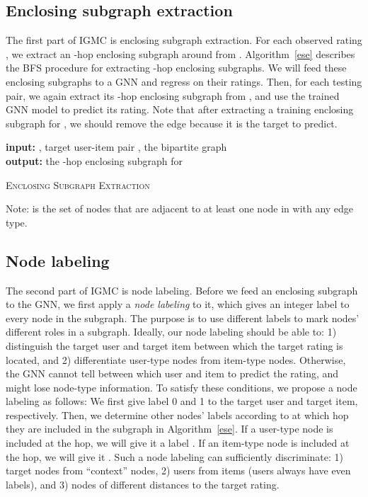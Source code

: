 \documentclass{article} \usepackage{iclr2020_conference,times}
\begin{document}
\subsection{Enclosing subgraph extraction}
The first part of IGMC is enclosing subgraph extraction. For each observed rating , we extract an -hop enclosing subgraph around  from . Algorithm~\ref{ese} describes the BFS procedure for extracting -hop enclosing subgraphs. We will feed these enclosing subgraphs to a GNN and regress on their ratings. Then, for each testing  pair, we again extract its -hop enclosing subgraph from , and use the trained GNN model to predict its rating. Note that after extracting a training enclosing subgraph for , we should remove the edge  because it is the target to predict. 

\begin{algorithm}[tp]
\begin{algorithmic}[1]
\STATE \textbf{input:} , target user-item pair , the bipartite graph  \\
\STATE \textbf{output:} the -hop enclosing subgraph  for \\
\STATE{}
\FOR{}
\STATE{}
\STATE{}
\STATE{}
\STATE{}
\ENDFOR
\RETURN{}
\end{algorithmic}
\caption{\textsc{Enclosing Subgraph Extraction}}\label{ese}
\footnotesize Note:  is the set of nodes that are adjacent to at least one node in  with any edge type.
\end{algorithm}

\subsection{Node labeling}
The second part of IGMC is node labeling. Before we feed an enclosing subgraph to the GNN, we first apply a \textit{node labeling} to it, which gives an integer label to every node in the subgraph. The purpose is to use different labels to mark nodes' different roles in a subgraph. Ideally, our node labeling should be able to: 1) distinguish the target user and target item between which the target rating is located, and 2) differentiate user-type nodes from item-type nodes. Otherwise, the GNN cannot tell between which user and item to predict the rating, and might lose node-type information. To satisfy these conditions, we propose a node labeling as follows: We first give label 0 and 1 to the target user and target item, respectively. Then, we determine other nodes' labels according to at which hop they are included in the subgraph in Algorithm~\ref{ese}. If a user-type node is included at the  hop, we will give it a label . If an item-type node is included at the  hop, we will give it . Such a node labeling can sufficiently discriminate: 1) target nodes from ``context'' nodes, 2) users from items (users always have even labels), and 3) nodes of different distances to the target rating. 
\end{document}
